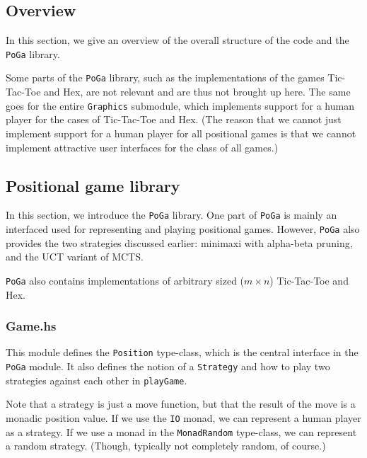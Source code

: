 \subsection {Overview}

In this section, we give an overview of the overall structure of the code and the \texttt{PoGa} library.


Some parts of the \texttt{PoGa} library, such as the implementations of the games Tic-Tac-Toe and Hex, are not relevant and are thus not brought up here.
The same goes for the entire \texttt{Graphics} submodule, which implements support for a human player for the cases of Tic-Tac-Toe and Hex.
(The reason that we cannot just implement support for a human player for all positional games is that we cannot implement attractive user interfaces for the class of all games.)


\subsection {Positional game library}

In this section, we introduce the \texttt{PoGa} library.
One part of \texttt{PoGa} is mainly an interfaced used for representing and playing positional games.
However, \texttt{PoGa} also provides the two strategies discussed earlier: minimaxi with alpha-beta pruning, and the UCT variant of MCTS.

\texttt{PoGa} also contains implementations of arbitrary sized ($m \times n$) Tic-Tac-Toe and Hex.

\subsubsection {Game.hs}

This module defines the \texttt{Position} type-class, which is the central interface in the \texttt{PoGa} module.
It also defines the notion of a \texttt{Strategy} and how to play two strategies against each other in \texttt{playGame}.

Note that a strategy is just a move function, but that the result of the move is a monadic position value.
If we use the \texttt{IO} monad, we can represent a human player as a strategy. If we use a monad in the \texttt{MonadRandom} type-class, we can represent a random strategy. (Though, typically not completely random, of course.)

